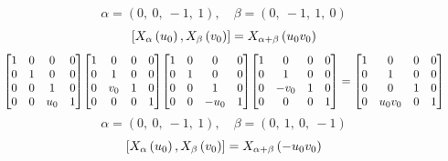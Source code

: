 \documentclass[11pt]{article}
\theoremstyle{definition}
\begin{document}
\[
\alpha = \left( 0, \  0, \  -1, \  1\right), \quad \beta = \left( 0, \  -1, \  1, \  0\right)
\]
\[
\scaletoalign{\textwidth}{\left[ X_{\alpha}\left(u_{0}\right), X_{\beta}\left(v_{0}\right) \right] = X_{\alpha + \beta}\left(u_{0} v_{0}\right)}
\]
\[
\scaletoalign{\textwidth}{{\left[\begin{matrix}1 & 0 & 0 & 0\\0 & 1 & 0 & 0\\0 & 0 & 1 & 0\\0 & 0 & u_{0} & 1\end{matrix}\right]} {\left[\begin{matrix}1 & 0 & 0 & 0\\0 & 1 & 0 & 0\\0 & v_{0} & 1 & 0\\0 & 0 & 0 & 1\end{matrix}\right]} {\left[\begin{matrix}1 & 0 & 0 & 0\\0 & 1 & 0 & 0\\0 & 0 & 1 & 0\\0 & 0 & - u_{0} & 1\end{matrix}\right]} {\left[\begin{matrix}1 & 0 & 0 & 0\\0 & 1 & 0 & 0\\0 & - v_{0} & 1 & 0\\0 & 0 & 0 & 1\end{matrix}\right]} = {\left[\begin{matrix}1 & 0 & 0 & 0\\0 & 1 & 0 & 0\\0 & 0 & 1 & 0\\0 & u_{0} v_{0} & 0 & 1\end{matrix}\right]}}
\]
\[
\alpha = \left( 0, \  0, \  -1, \  1\right), \quad \beta = \left( 0, \  1, \  0, \  -1\right)
\]
\[
\scaletoalign{\textwidth}{\left[ X_{\alpha}\left(u_{0}\right), X_{\beta}\left(v_{0}\right) \right] = X_{\alpha + \beta}\left(- u_{0} v_{0}\right)}
\]
\end{document}
